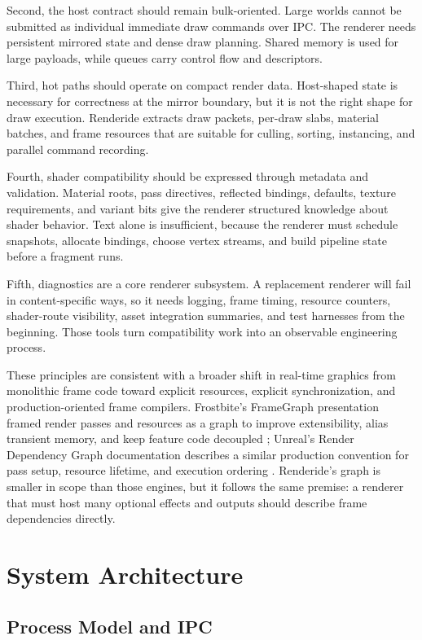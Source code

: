 \documentclass[acmtog,screen,nonacm]{acmart}
\begin{document}
Second, the host contract should remain bulk-oriented. Large worlds cannot be submitted as individual immediate draw commands over IPC. The renderer needs persistent mirrored state and dense draw planning. Shared memory is used for large payloads, while queues carry control flow and descriptors.

Third, hot paths should operate on compact render data. Host-shaped state is necessary for correctness at the mirror boundary, but it is not the right shape for draw execution. Renderide extracts draw packets, per-draw slabs, material batches, and frame resources that are suitable for culling, sorting, instancing, and parallel command recording.

Fourth, shader compatibility should be expressed through metadata and validation. Material roots, pass directives, reflected bindings, defaults, texture requirements, and variant bits give the renderer structured knowledge about shader behavior. Text alone is insufficient, because the renderer must schedule snapshots, allocate bindings, choose vertex streams, and build pipeline state before a fragment runs.

Fifth, diagnostics are a core renderer subsystem. A replacement renderer will fail in content-specific ways, so it needs logging, frame timing, resource counters, shader-route visibility, asset integration summaries, and test harnesses from the beginning. Those tools turn compatibility work into an observable engineering process.

These principles are consistent with a broader shift in real-time graphics from monolithic frame code toward explicit resources, explicit synchronization, and production-oriented frame compilers. Frostbite's FrameGraph presentation framed render passes and resources as a graph to improve extensibility, alias transient memory, and keep feature code decoupled \citep{frostbiteFrameGraph}; Unreal's Render Dependency Graph documentation describes a similar production convention for pass setup, resource lifetime, and execution ordering \citep{unrealRdg}. Renderide's graph is smaller in scope than those engines, but it follows the same premise: a renderer that must host many optional effects and outputs should describe frame dependencies directly.

\section{System Architecture}

\subsection{Process Model and IPC}
\end{document}
